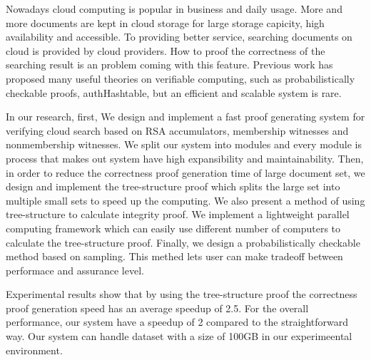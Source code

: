 \begin{englishabstract}

	Nowadays cloud computing is popular in business and daily usage. 
	More and more documents are kept in cloud storage for large storage capicity, high availability and accessible. 
	To providing better service, searching documents on cloud is provided by cloud providers.
	How to proof the correctness of the searching result is an problem coming with this feature.
	Previous work has proposed many useful theories on verifiable computing, such as probabilistically checkable proofs, authHashtable, but an efficient and scalable system is rare.

	In our research, first, We design and implement a fast proof generating system for verifying cloud search based on RSA accumulators, membership witnesses and nonmembership witnesses. We split our system into modules and every module is process that makes out system have high expansibility and maintainability. 
	Then, in order to reduce the correctness proof generation time of large document set, we design and implement the tree-structure proof which splits the large set into multiple small sets to speed up the computing. We also present a method of using tree-structure to calculate integrity proof.
	We implement a lightweight parallel computing framework which can easily use different number of computers to calculate the tree-structure proof.
	Finally, we design a probabilistically checkable method based on sampling. This methed lets user can make tradeoff between performace and assurance level.

    Experimental results show that by using the tree-structure proof the correctness proof generation speed has an average speedup of 2.5. For the overall performance, our system have a speedup of 2 compared to the straightforward way. Our system can handle dataset with a size of 100GB in our experimeental environment.

\end{englishabstract}
